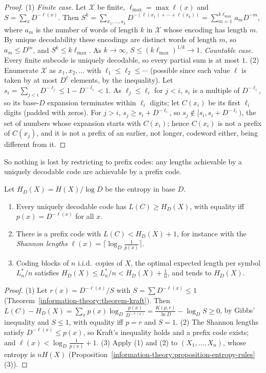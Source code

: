 \begin{proof}
(1) \emph{Finite case.} Let $\mathcal{X}$ be finite, $\ell_{\max} = \max\ell(x)$ and $S = \sum_xD^{-\ell(x)}$. Then $S^k = \sum_{x_1, \ldots, x_k}D^{-(\ell(x_1) + \cdots + \ell(x_k))} = \sum_{m=1}^{k\ell_{\max}}a_mD^{-m}$, where $a_m$ is the number of words of
length $k$ in $\mathcal{X}$ whose encoding has length $m$. By unique decodability these encodings are distinct words of length $m$, so $a_m \leq D^m$, and $S^k \leq k\ell_{\max}$. As $k \to \infty$, $S \leq (k\ell_{\max})^{1/k} \to 1$. \emph{Countable
case.} Every finite subcode is uniquely decodable, so every partial sum is at most $1$.
(2) Enumerate $\mathcal{X}$ as $x_1, x_2, \ldots$ with $\ell_1 \leq \ell_2 \leq \cdots$ (possible since each value $\ell$ is taken by at most $D^\ell$ elements, by the inequality). Let $s_i = \sum_{j < i}D^{-\ell_j} \leq 1 - D^{-\ell_i} < 1$. As $\ell_j \leq \ell_i$ for $j < i$, $s_i$ is a multiple of $D^{-\ell_i}$, so its base-$D$ expansion terminates within $\ell_i$ digits; let $C(x_i)$ be its
first $\ell_i$ digits (padded with zeros). For $j > i$, $s_j \geq s_i + D^{-\ell_i}$, so $s_j \notin [s_i, s_i + D^{-\ell_i})$, the set of numbers whose expansion starts with $C(x_i)$; hence
$C(x_i)$ is not a prefix of $C(x_j)$, and it is not a prefix of an earlier, not longer, codeword either, being different from it.
\end{proof}

So nothing is lost by restricting to prefix codes: any lengths achievable by a uniquely decodable code are achievable by a prefix code.

\begin{theorem}\label{information-theory:theorem-source-coding}
Let $H_D(X) = H(X)/\log D$ be the entropy in base $D$.
\begin{enumerate}
\item Every uniquely decodable code has $L(C) \geq H_D(X)$, with equality iff $p(x) = D^{-\ell(x)}$ for all $x$.
\item There is a prefix code with $L(C) < H_D(X) + 1$, for instance with the \emph{Shannon lengths} $\ell(x) = \lceil\log_D\frac{1}{p(x)}\rceil$.
\item Coding blocks of $n$ i.i.d.\ copies of $X$, the optimal expected length per symbol $L_n^*/n$ satisfies $H_D(X) \leq L_n^*/n < H_D(X) + \frac1n$, and tends to $H_D(X)$.
\end{enumerate}
\end{theorem}

\begin{proof}
(1) Let $r(x) = D^{-\ell(x)}/S$ with $S = \sum D^{-\ell(x)} \leq 1$ (Theorem~\ref{information-theory:theorem-kraft}). Then
$L(C) - H_D(X) = \sum_xp(x)\log_D\frac{p(x)}{D^{-\ell(x)}} = \frac{K(p, r)}{\ln D} - \log_DS \geq 0$, by Gibbs' inequality and $S \leq 1$, with equality iff $p = r$ and $S = 1$.
(2) The Shannon lengths satisfy $D^{-\ell(x)} \leq p(x)$, so Kraft's inequality holds and a prefix code exists; and $\ell(x) < \log_D\frac{1}{p(x)} + 1$.
(3) Apply (1) and (2) to $(X_1, \ldots, X_n)$, whose entropy is $nH(X)$ (Proposition~\ref{information-theory:proposition-entropy-rules}(3)).
\end{proof}

